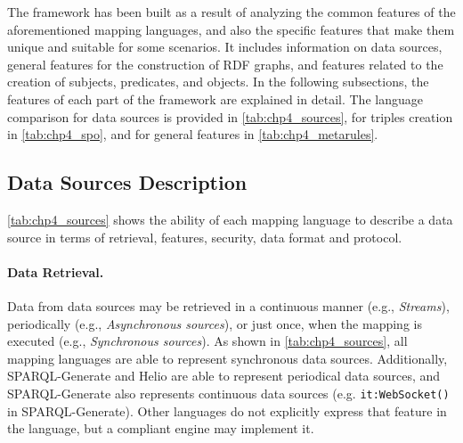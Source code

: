 The framework has been built as a result of analyzing the common features of the aforementioned mapping languages, and also the specific features that make them unique and suitable for some scenarios. It includes information on data sources, general features for the construction of RDF graphs, and features related to the creation of subjects, predicates, and objects. In the following subsections, the features of each part of the framework are explained in detail. The language comparison for data sources is provided in \cref{tab:chp4_sources}, for triples creation in \cref{tab:chp4_spo}, and for general features in \cref{tab:chp4_metarules}. 





\subsection{Data Sources Description}


\cref{tab:chp4_sources} shows the ability of each mapping language to describe a data source in terms of retrieval, features, security, data format and protocol. 


\noindent\paragraph{\textbf{Data Retrieval.}} Data from data sources may be retrieved in a continuous manner (e.g., \textit{Streams}),  periodically (e.g., \textit{Asynchronous sources}), or just once, when the mapping is executed (e.g., \textit{Synchronous sources}). As shown in \cref{tab:chp4_sources}, all mapping languages are able to represent synchronous data sources. Additionally, SPARQL-Generate and Helio are able to represent periodical data sources, and SPARQL-Generate also represents continuous data sources (e.g. \texttt{it:WebSocket()} in SPARQL-Generate). Other languages do not explicitly express that feature in the language, but a compliant engine may implement it.

